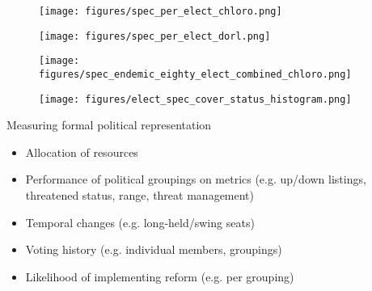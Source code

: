 \documentclass{beamer}
\begin{document}
\begin{frame}{}
\begin{figure}
    \centering
    \texttt{[image: figures/spec\_per\_elect\_chloro.png]}
\end{figure}
\end{frame}

\begin{frame}{}
\begin{figure}
    \centering
    \texttt{[image: figures/spec\_per\_elect\_dorl.png]}
\end{figure}
\end{frame}

\begin{frame}{}
\begin{figure}
    \centering
    \texttt{[image: figures/spec\_endemic\_eighty\_elect\_combined\_chloro.png]}
\end{figure}
\end{frame}

\begin{frame}{}
\begin{figure}
    \centering
    \texttt{[image: figures/elect\_spec\_cover\_status\_histogram.png]}
\end{figure}  
\end{frame}

\begin{frame}{Measuring formal political representation} %
\begin{itemize}
    \item<2-> Allocation of resources
    \item<2-> Performance of political groupings on metrics (e.g. up/down listings, threatened status, range, threat management)
    \item<2-> Temporal changes (e.g. long-held/swing seats)
    \item<2-> Voting history (e.g. individual members, groupings)
    \item<2-> Likelihood of implementing reform (e.g. per grouping)
\end{itemize}
\end{frame}
\end{document}
